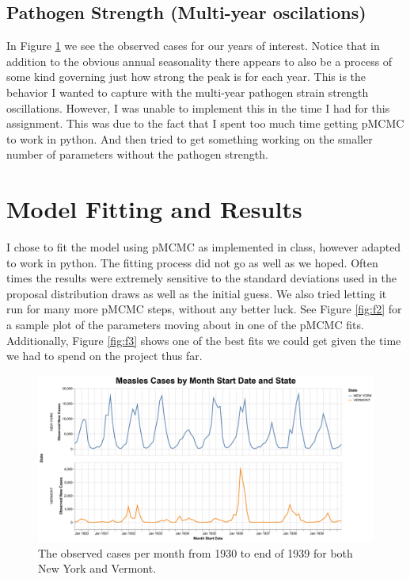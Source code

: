 \documentclass[11pt]{amsart}
\begin{document}
\subsection{Pathogen Strength (Multi-year oscilations)} In Figure \ref{fig:f1} we see the observed cases for our years of interest.
Notice that in addition to the obvious annual seasonality there appears to also be a process of some kind governing just how strong the peak is for each year.
This is the behavior I wanted to capture with the multi-year pathogen strain strength oscillations.
However, I was unable to implement this in the time I had for this assignment.
This was due to the fact that I spent too much time getting pMCMC to work in python.
And then tried to get something working on the smaller number of parameters without the pathogen strength.

\section{Model Fitting and Results}\label{sec:results}
I chose to fit the model using pMCMC as implemented in class, however adapted to work in python.
The fitting process did not go as well as we hoped.
Often times the results were extremely sensitive to the standard deviations used in the proposal distribution draws as well as the initial guess.
We also tried letting it run for many more pMCMC steps, without any better luck.
See Figure \ref{fig:f2} for a sample plot of the parameters moving about in one of the pMCMC fits.
Additionally, Figure \ref{fig:f3} shows one of the best fits we could get given the time we had to spend on the project thus far.

\begin{figure}[h]
	\centering
	\includegraphics[width=1\textwidth]{../visuals/measles_cases_by_state_and_month_start.png}
 	\caption{The observed cases per month from 1930 to end of 1939 for both New York and Vermont.}\label{fig:f1}
\end{figure}
\end{document}
